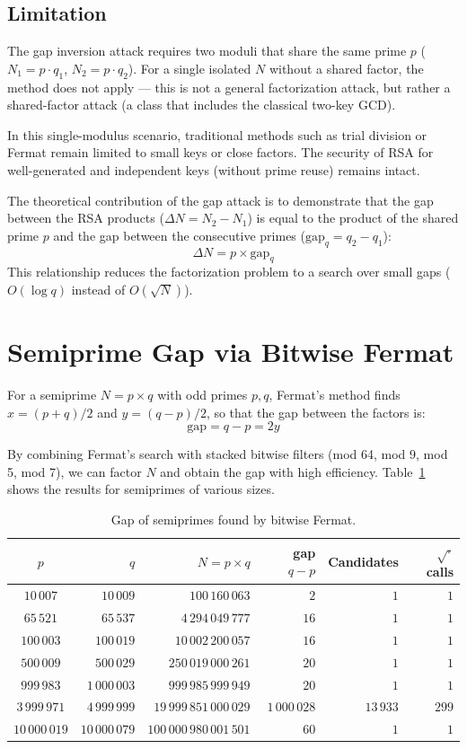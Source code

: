 \documentclass[12pt,a4paper]{article}
\theoremstyle{plain}
\begin{document}
\subsection{Limitation}

The gap inversion attack requires two moduli that share the
same prime $p$ ($N_1 = p \cdot q_1$, $N_2 = p \cdot q_2$).
For a single isolated $N$ without a shared factor, the method
does not apply --- this is not a general factorization attack,
but rather a shared-factor attack (a class that includes the
classical two-key GCD).

In this single-modulus scenario, traditional methods such as
trial division or Fermat remain limited to small keys or close
factors. The security of RSA for well-generated and independent
keys (without prime reuse) remains intact.

The theoretical contribution of the gap attack is to demonstrate
that the gap between the RSA products ($\Delta N = N_2 - N_1$)
is equal to the product of the shared prime $p$ and the gap between
the consecutive primes ($\text{gap}_q = q_2 - q_1$):
\[
\Delta N = p \times \text{gap}_q
\]
This relationship reduces the factorization problem to a search
over small gaps ($O(\log q)$ instead of $O(\sqrt{N})$).

\section{Semiprime Gap via Bitwise Fermat}
\label{sec:semiprime_gap}

For a semiprime $N = p \times q$ with odd primes $p,q$, Fermat's
method finds $x = (p+q)/2$ and $y = (q-p)/2$, so that the gap
between the factors is:
\[
\text{gap} = q - p = 2y
\]

By combining Fermat's search with stacked bitwise filters
(mod 64, mod 9, mod 5, mod 7), we can factor $N$ and obtain the gap
with high efficiency. Table~\ref{tab:semiprime_gap} shows the
results for semiprimes of various sizes.

\begin{table}[htbp]
\centering
\caption{Gap of semiprimes found by bitwise Fermat.}
\label{tab:semiprime_gap}
\begin{tabular}{crrrrr}
\hline
$p$ & $q$ & $N = p\times q$ & gap $q-p$ & Candidates & $\sqrt{\cdot}$ calls \\
\hline
$10\,007$ & $10\,009$ & $100\,160\,063$ & $2$ & $1$ & $1$ \\
$65\,521$ & $65\,537$ & $4\,294\,049\,777$ & $16$ & $1$ & $1$ \\
$100\,003$ & $100\,019$ & $10\,002\,200\,057$ & $16$ & $1$ & $1$ \\
$500\,009$ & $500\,029$ & $250\,019\,000\,261$ & $20$ & $1$ & $1$ \\
$999\,983$ & $1\,000\,003$ & $999\,985\,999\,949$ & $20$ & $1$ & $1$ \\
$3\,999\,971$ & $4\,999\,999$ & $19\,999\,851\,000\,029$ & $1\,000\,028$ & $13\,933$ & $299$ \\
$10\,000\,019$ & $10\,000\,079$ & $100\,000\,980\,001\,501$ & $60$ & $1$ & $1$ \\
\hline
\end{tabular}
\end{table}
\end{document}
